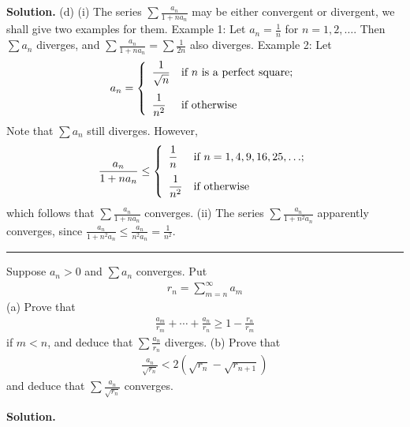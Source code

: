 \documentclass[12pt]{article}
\theoremstyle{definition}
\begin{document}
\smallskip
\noindent\textbf{Solution.}\quad
(d) (i) The series $\sum\frac{a_n}{1+na_n}$ may be either convergent or divergent, we shall give two examples for them. 
Example 1: Let $a_n=\frac{1}{n}$ for $n=1,2,\ldots$. Then $\sum a_n$ diverges, and $\sum\frac{a_n}{1+na_n}=\sum\frac{1}{2n}$ also diverges.
Example 2: Let
\begin{align*}
a_n
=\left\{\begin{array}{ll}
\dfrac{1}{\sqrt{n}} & \mbox{if $n$ is a perfect square;}\vspace{0.1in} \\
\dfrac{1}{n^2} & \mbox{if otherwise}
\end{array}\right.
\end{align*}
Note that $\sum a_n$ still diverges. However,
\begin{align*}
\frac{a_n}{1+na_n}\le
\left\{\begin{array}{ll}
\dfrac{1}{n} & \mbox{if $n=1,4,9,16,25,\ldots$;}\vspace{0.1in} \\
\dfrac{1}{n^2} & \mbox{if otherwise}
\end{array}\right.
\end{align*}
which follows that $\sum\frac{a_n}{1+na_n}$ converges.
(ii) The series $\sum\frac{a_n}{1+n^2a_n}$ apparently converges, since $\frac{a_n}{1+n^2a_n}\le\frac{a_n}{n^2a_n}=\frac{1}{n^2}$.



\bigskip\noindent\hrule\bigskip

Suppose $a_n>0$ and $\sum a_n$ converges. Put
\begin{align*}
r_n=\sum_{m=n}^\infty a_m
\end{align*}
(a) Prove that
\begin{align*}
\frac{a_m}{r_m}+\cdots+\frac{a_n}{r_n}\ge 1-\frac{r_n}{r_m}
\end{align*}
if $m<n$, and deduce that $\sum\frac{a_n}{r_n}$ diverges.
(b) Prove that
\begin{align*}
\frac{a_n}{\sqrt{r_n}}<2\left(\sqrt{r_n}-\sqrt{r_{n+1}}\right)
\end{align*}
and deduce that $\sum\frac{a_n}{\sqrt{r_n}}$ converges.

\smallskip
\noindent\textbf{Solution.}\quad
\end{document}
